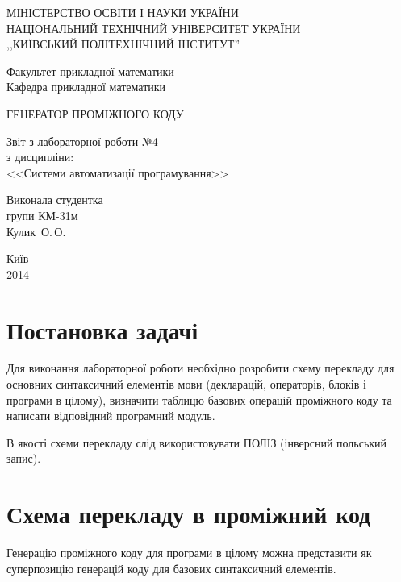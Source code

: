 \documentclass[a4paper,12pt,notitlepage,pdftex]{scrreprt}
\begin{document}
\begin{titlepage}
    \begin{center}
        \MakeUppercase{Міністерство освіти і науки України}\\
        \MakeUppercase{Національний технічний університет України}\\
        \MakeUppercase{,,Київський політехнічний інститут''}\\
        \vspace*{2em}

        Факультет прикладної математики\\
        Кафедра прикладної математики

        \vfill

        \MakeUppercase{Генератор проміжного коду}\\
        \vspace*{1em}

        Звіт з лабораторної роботи №4\\
        з дисципліни:\\
        <<Системи автоматизації програмування>>
    \end{center}

    \vfill
    \hfill\begin{minipage}{0.4\textwidth}
        Виконала студентка\\
        групи КМ-31м\\
        Кулик~О.\,О.
    \end{minipage}

    \vfill
    \begin{center}
        Київ\\
        2014
    \end{center}
\end{titlepage}

\tableofcontents

\chapter{Постановка задачі}
\label{chap:first}
    Для виконання лабораторної роботи необхідно розробити схему перекладу для основних синтаксичний елементів мови
    (декларацій, операторів, блоків і програми в цілому), визначити таблицю базових операцій проміжного коду та
    написати відповідний програмний модуль.

    В якості схеми перекладу слід використовувати ПОЛІЗ (інверсний польський запис).
\chapter{Схема перекладу в проміжний код}
    Генерацію проміжного коду для програми в цілому можна представити як суперпозицію генерацій коду для базових
    синтаксичний елементів.
\end{document}
